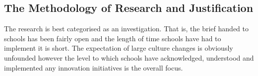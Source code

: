 \subsection{The Methodology of Research and Justification}
The research is best categorised as an investigation. That is, the brief handed to schools has been fairly open and the length of time schools have had to implement it is short. The expectation of large culture changes is obviously unfounded however the level to which schools have acknowledged, understood and implemented any innovation initiatives is the overall focus.





